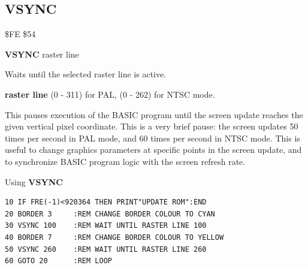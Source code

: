 \subsection{VSYNC}
\begin{description}[leftmargin=2cm,style=nextline]
\item [Token:] \$FE \$54
\item [Format:] {\bf VSYNC} raster line
\item [Usage:] Waits until the selected raster line is active.

               {\bf raster line} (0 - 311) for PAL, (0 - 262) for NTSC mode.

               This pauses execution of the BASIC program until the screen
               update reaches the given vertical pixel coordinate. This is a
               very brief pause: the screen updates 50 times per second in PAL
               mode, and 60 times per second in NTSC mode. This is useful to
               change graphics parameters at specific points in the screen
               update, and to synchronize BASIC program logic with the screen
               refresh rate.

\item [Example:] Using {\bf VSYNC}
\begin{tcolorbox}[colback=black,coltext=white]
\verbatimfont{\codefont}
\begin{verbatim}
10 IF FRE(-1)<920364 THEN PRINT"UPDATE ROM":END
20 BORDER 3     :REM CHANGE BORDER COLOUR TO CYAN
30 VSYNC 100    :REM WAIT UNTIL RASTER LINE 100
40 BORDER 7     :REM CHANGE BORDER COLOUR TO YELLOW
50 VSYNC 260    :REM WAIT UNTIL RASTER LINE 260
60 GOTO 20      :REM LOOP
\end{verbatim}
\end{tcolorbox}
\end{description}


\newpage
